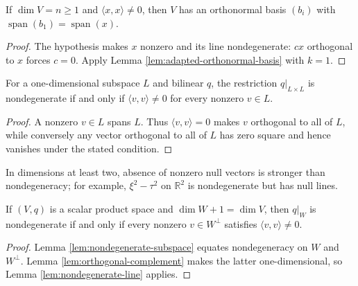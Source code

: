 \begin{lemma}
\label{lem:adapted-orthonormal-basis-line}
\leanok
{}
If $\dim V=n\ge1$ and $\langle x,x\rangle\ne0$, then $V$ has an orthonormal basis $(b_i)$ with $\operatorname{span}(b_1)=\operatorname{span}(x)$.
\end{lemma}
\begin{proof}
\leanok
{}
\sketch The hypothesis makes $x$ nonzero and its line nondegenerate: $cx$ orthogonal to $x$ forces $c=0$. Apply Lemma \ref{lem:adapted-orthonormal-basis} with $k=1$.
\end{proof}

\begin{lemma}
\label{lem:nondegenerate-line}
\leanok
For a one-dimensional subspace $L$ and bilinear $q$, the restriction $q|_{L\times L}$ is nondegenerate if and only if $\langle v,v\rangle\ne0$ for every nonzero $v\in L$.
\end{lemma}
\begin{proof}
\leanok
\sketch A nonzero $v\in L$ spans $L$. Thus $\langle v,v\rangle=0$ makes $v$ orthogonal to all of $L$, while conversely any vector orthogonal to all of $L$ has zero square and hence vanishes under the stated condition.
\end{proof}

In dimensions at least two, absence of nonzero null vectors is stronger than nondegeneracy; for example, $\xi^2-\tau^2$ on $\mathbb R^2$ is nondegenerate but has null lines.

\begin{lemma}
\label{lem:hyperplane-nondegenerate}
\leanok
{}
If $(V,q)$ is a scalar product space and $\dim W+1=\dim V$, then $q|_W$ is nondegenerate if and only if every nonzero $v\in W^\perp$ satisfies $\langle v,v\rangle\ne0$.
\end{lemma}
\begin{proof}
\leanok
{}
\sketch Lemma \ref{lem:nondegenerate-subspace} equates nondegeneracy on $W$ and $W^\perp$. Lemma \ref{lem:orthogonal-complement} makes the latter one-dimensional, so Lemma \ref{lem:nondegenerate-line} applies.
\end{proof}

